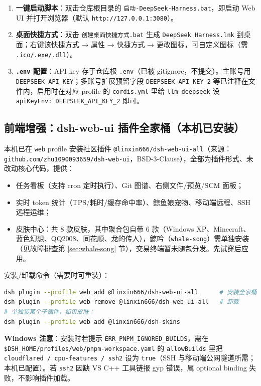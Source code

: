 \documentclass[11pt]{ctexart}
\newcommand{\code}[1]{\texttt{\small #1}}
\begin{document}
\begin{enumerate}[itemsep=1pt]
  \item \textbf{一键启动脚本}：双击仓库根目录的 \code{启动-DeepSeek-Harness.bat}，即启动 Web UI 并打开浏览器（默认 \code{http://127.0.0.1:3080}）。
  \item \textbf{桌面快捷方式}：双击 \code{创建桌面快捷方式.bat} 生成 \code{DeepSeek Harness.lnk} 到桌面；右键该快捷方式 → 属性 → 快捷方式 → 更改图标，可自定义图标（需 \code{.ico/.exe/.dll}）。
  \item \textbf{\code{.env} 配置}：API key 存于仓库根 \code{.env}（已被 gitignore，不提交）。主账号用 \code{DEEPSEEK\_API\_KEY}；多账号扩展预留字段 \code{DEEPSEEK\_API\_KEY\_2} 等已注释在文件内，启用时在对应 profile 的 \code{cordis.yml} 里给 \code{llm-deepseek} 设 \code{apiKeyEnv: DEEPSEEK\_API\_KEY\_2} 即可。
\end{enumerate}

\subsection{前端增强：dsh-web-ui 插件全家桶（本机已安装）}

本机已在 \code{web} profile 安装社区插件 \code{@linxin666/dsh-web-ui-all}（来源：\code{github.com/zhu1090093659/dsh-web-ui}，BSD-3-Clause），全部为插件形式、未改动核心代码，提供：

\begin{itemize}[itemsep=1pt]
  \item 任务看板（支持 cron 定时执行）、Git 图谱、右侧文件/预览/SCM 面板；
  \item 实时 token 统计（TPS/耗时/缓存命中率）、鲸鱼娘宠物、移动端远程、SSH 远程运维；
  \item 皮肤中心：共 8 款皮肤，其中聚合包自带 6 款（Windows XP、Minecraft、蓝色幻想、QQ2008、同花顺、龙的传人），鲸吟（\code{whale-song}）需单独安装（见故障排查第 \ref{sec:whale-song} 节），交易终端暂未随包分发。先试穿后应用。
\end{itemize}

安装/卸载命令（需要时可重装）：
\begin{lstlisting}[language=bash]
dsh plugin --profile web add @linxin666/dsh-web-ui-all      # 安装全家桶
dsh plugin --profile web remove @linxin666/dsh-web-ui-all   # 卸载
# 单独装某个子插件，如仅皮肤：
dsh plugin --profile web add @linxin666/dsh-skins
\end{lstlisting}

\noindent \textbf{Windows 注意}：安装时若提示 \code{ERR\_PNPM\_IGNORED\_BUILDS}，需在 \code{\$DSH\_HOME/profiles/web/pnpm-workspace.yaml} 的 \code{allowBuilds} 里把 \code{cloudflared / cpu-features / ssh2} 设为 \code{true}（SSH 与移动端公网隧道所需；本机已配置）。若 \code{ssh2} 因缺 VS C++ 工具链报 gyp 错误，属 optional binding 失败，不影响插件加载。
\end{document}
